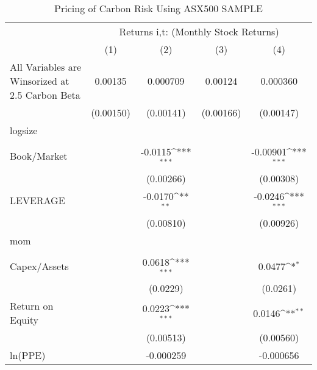 \begin{table}[htbp]\centering
\def\sym#1{\ifmmode^{#1}\else\(^{#1}\)\fi}
\caption{Pricing of Carbon Risk Using ASX500 SAMPLE}
\begin{tabular}{l*{4}{c}}
\hline\hline
                &\multicolumn{4}{c}{Returns i,t: (Monthly Stock Returns) }                  \\\cmidrule(lr){2-5}
                &\multicolumn{1}{c}{(1)}         &\multicolumn{1}{c}{(2)}         &\multicolumn{1}{c}{(3)}         &\multicolumn{1}{c}{(4)}         \\
All Variables are Winsorized at 2.5%
Carbon Beta     &  0.00135         & 0.000709         &  0.00124         & 0.000360         \\
                &(0.00150)         &(0.00141)         &(0.00166)         &(0.00147)         \\
logsize         &                  &                  &                  &                  \\
                &                  &                  &                  &                  \\
Book/Market     &                  &  -0.0115\sym{***}&                  & -0.00901\sym{***}\\
                &                  &(0.00266)         &                  &(0.00308)         \\
LEVERAGE        &                  &  -0.0170\sym{**} &                  &  -0.0246\sym{***}\\
                &                  &(0.00810)         &                  &(0.00926)         \\
mom             &                  &                  &                  &                  \\
                &                  &                  &                  &                  \\
Capex/Assets    &                  &   0.0618\sym{***}&                  &   0.0477\sym{*}  \\
                &                  & (0.0229)         &                  & (0.0261)         \\
Return on Equity&                  &   0.0223\sym{***}&                  &   0.0146\sym{**} \\
                &                  &(0.00513)         &                  &(0.00560)         \\
ln(PPE)         &                  &-0.000259         &                  &-0.000656         \\

\end{tabular}
\end{table}
